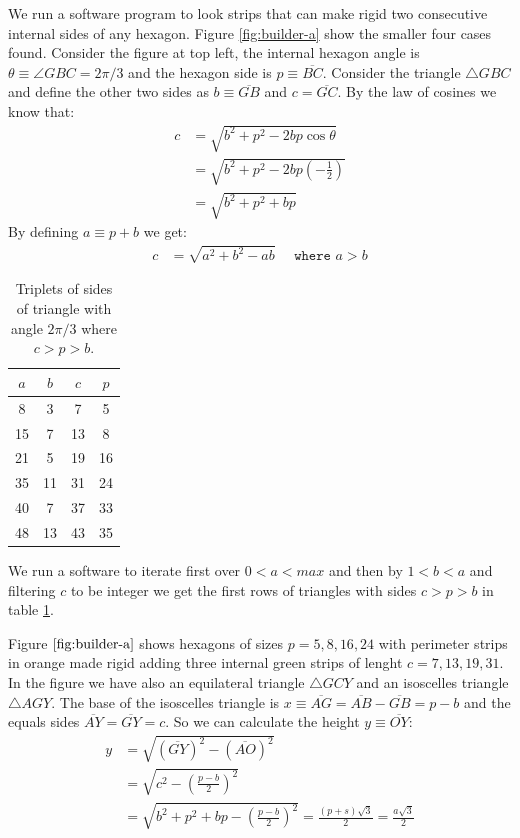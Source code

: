 \documentclass[11pt]{article}
\begin{document}
We run a software program to look strips that can make rigid two consecutive internal sides of any hexagon. Figure \ref{fig:builder-a} show the smaller four cases found. Consider the figure at top left, the internal hexagon angle is $\theta \equiv \angle{GBC} = 2\pi/3$ and the hexagon side is $p \equiv \overline{BC}$. Consider the triangle $\triangle{GBC}$ and define the other two sides as $b \equiv \overline{GB}$ and $c = \overline{GC}$. By the law of cosines we know that:
\begin{align}
c &= \sqrt{b^2 + p^2 - 2bp\cos\theta} \nonumber\\
 &= \sqrt{b^2 + p^2 - 2bp\left(-\frac{1}{2}\right)} \nonumber\\
 &= \sqrt{b^2 + p^2 + bp}
\end{align}
By defining $a \equiv p + b$ we get:
\begin{align}
c &= \sqrt{a^2 + b^2 - ab} \quad \texttt{ where } a > b
\end{align}

\begin{table}[H]
\begin{center}
\begin{tabular}{||c c c c||} 
 \hline
 $a$ & $b$ & $c$ & $p$ \\ [0.5ex] 
 \hline\hline
  8 &  3 &  7 &  5 \\ \hline
 15 &  7 & 13 &  8 \\ \hline
 21 &  5 & 19 & 16 \\ \hline
 35 & 11 & 31 & 24 \\ \hline
 40 &  7 & 37 & 33 \\ \hline
 48 & 13 & 43 & 35 \\ \hline
\end{tabular}
\caption{Triplets of sides of triangle with angle $2\pi/3$ where $c > p > b$.}
\label{tbl:triplets}
\end{center}
\end{table}

We run a software to iterate first over $0 < a < max$ and then by $1 < b < a$ and filtering $c$ to be integer we get the first rows of triangles with sides $c > p > b$ in table \ref{tbl:triplets}.

Figure $\ref{fig:builder-a}$ shows hexagons of sizes $p = 5,8,16,24$ with perimeter strips in orange made rigid adding three internal green strips of lenght $c = 7,13,19,31$. In the figure we have also an equilateral triangle $\triangle{GCY}$ and an isoscelles triangle $\triangle{AGY}$. The base of the isoscelles triangle is $x \equiv \overline{AG} = \overline{AB} - \overline{GB} = p - b$ and the equals sides $\overline{AY} = \overline{GY} = c$. So we can calculate the height $y \equiv \overline{OY}$:
\begin{align}
y &= \sqrt{(\overline{GY})^2 - (\overline{AO})^2} \nonumber\\
 &= \sqrt{c^2 - \left(\frac{p - b}2\right)^2} \nonumber\\
 &= \sqrt{b^2 + p^2 + bp - \left(\frac{p-b}2\right)^2} = \frac{(p+s)\sqrt3}2 = \frac{a\sqrt3}2
\end{align}
\end{document}
